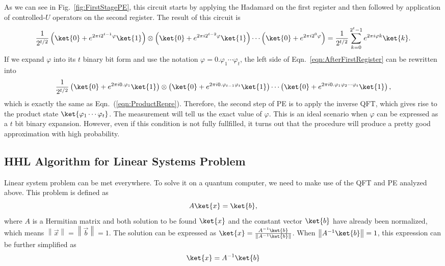 As we can see in Fig.~\ref{fig:FirstStagePE}, this circuit starts by applying the Hadamard on the first register and then followed by application of controlled-$U$ operators on the second register. The result of this circuit is
\begin{equation}
    \frac{1}{2^{t/2}}\left(\ket{0}+e^{2\pi i2^{t-1}\varphi}\ket{1}\right)\otimes\left(\ket{0}+e^{2\pi i2^{t-2}\varphi}\ket{1}\right)\cdots\left(\ket{0}+e^{2\pi i2^0\varphi}\right)=\frac{1}{2^{t/2}}\sum_{k=0}^{2^t-1}e^{2\pi i\varphi k}\ket{k}.
    \label{eqn:AfterFirstRegister}
\end{equation}
If we expand $\varphi$ into its $t$ binary bit form and use the notation $\varphi=0.\varphi_1\cdots\varphi_t$, the left side of Eqn.~\ref{eqn:AfterFirstRegister} can be rewritten into
\begin{equation}
    \frac{1}{2^{t/2}}\left(\ket{0}+e^{2\pi i0.\varphi_1}\ket{1}\right)\otimes\left(\ket{0}+e^{2\pi i0.\varphi_{t-1}\varphi_t}\ket{1}\right)\cdots\left(\ket{0}+e^{2\pi i0.\varphi_1\varphi_2\cdots\varphi_t}\ket{1}\right),
\end{equation}
which is exactly the same as Eqn.~(\ref{eqn:ProductRepre}). Therefore, the second step of PE is to apply the inverse QFT, which gives rise to the product state $\ket{\varphi_1\cdots\varphi_t}$. The measurement will tell us the exact value of $\varphi$. This is an ideal scenario when $\varphi$ can be expressed as a $t$ bit binary expansion. However, even if this condition is not fully fullfilled, it turns out that the procedure will produce a pretty good approximation with high probability.

\subsection{HHL Algorithm for Linear Systems Problem}
Linear system problem can be met everywhere. To solve it on a quantum computer, we need to make use of the QFT and PE analyzed above. This problem is defined as
\begin{equation}
    A\ket{x}=\ket{b},
\end{equation}
where $A$ is a Hermitian matrix and both solution to be found $\ket{x}$ and the constant vector $\ket{b}$ have already been normalized, which means $\left\|\vec{x}\right\|=\left\|\vec{b}\right\| =1$. The solution can be expressed as $\ket{x}=\frac{A^{-1}\ket{b}}{\left\| A^{-1}\ket{b}\right\| }$. When $\left\| A^{-1}\ket{b}\right\|=1$, this expression can be further simplified as
\begin{equation}
    \ket{x}=A^{-1}\ket{b}
    \label{eqn:solutionofA}
\end{equation}

